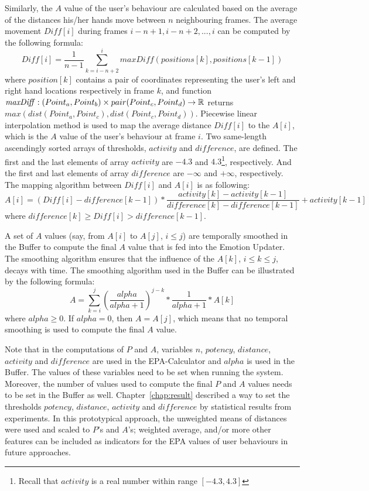 Similarly, the $A$ value of the user's behaviour are calculated based on the average of the distances his/her hands move between $n$ neighbouring frames. The average movement $\mathit{Diff}[i]$ during frames $i-n+1, i-n+2, ... , i$ can be computed by the following formula:
\begin{equation}
\mathit{Diff}[i]=\dfrac{1}{n-1}\sum_{k=i-n+2}^{i}\mathit{maxDiff}(positions[k],positions[k-1])
\end{equation}
where $position[k]$ contains a pair of coordinates representing the user's left and right hand locations respectively in frame $k$, and function $\mathit{maxDiff}: (Point_a, Point_b) \times pair(Point_c,\\ Point_d) \to \mathbb{R}$ returns $max(dist(Point_a, Point_c), dist(Point_c, Point_d))$. Piecewise linear interpolation method is used to map the average distance $\mathit{Diff}[i]$ to the $A[i]$, which is the $A$ value of the user's behaviour at frame $i$. Two same-length ascendingly sorted arrays of thresholds, $activity$ and $\mathit{difference}$, are defined. The first and the last elements of array $activity$ are $-4.3$ and $4.3$\footnote{Recall that $activity$ is a real number within range $[-4.3, 4.3]$}, respectively. And the first and last elements of array $\mathit{difference}$ are $-\infty$ and $+\infty$, respectively. The mapping algorithm between $\mathit{Diff}[i]$ and $A[i]$ is as following:
\begin{equation}
A[i]=(\mathit{Diff}[i]-\mathit{difference}[k-1])*\dfrac{activity[k] - activity[k-1]}{\mathit{difference}[k] - \mathit{difference}[k-1]}+activity[k-1]
\end{equation}
where $\mathit{difference}[k] \geq \mathit{Diff}[i] > \mathit{difference}[k-1]$.

A set of $A$ values (say, from $A[i]$ to $A[j]$, $i \leq j$) are temporally smoothed in the Buffer to compute the final $A$ value that is fed into the Emotion Updater. The smoothing algorithm ensures that the influence of the $A[k]$, $i \leq k \leq j$, decays with time. The smoothing algorithm used in the Buffer can be illustrated by the following formula:
\begin{equation}
A=\sum_{k=i}^{j}(\dfrac{alpha}{alpha+1})^{j-k}*\dfrac{1}{alpha+1}*A[k]
\end{equation}
where $alpha \geq 0$.
If $alpha=0$, then $A=A[j]$, which means that no temporal smoothing is used to compute the final $A$ value.

Note that in the computations of $P$ and $A$, variables $n$, $potency$, $distance$, $activity$ and $\mathit{difference}$ are used in the EPA-Calculator and $alpha$ is used in the Buffer. The values of these variables need to be set when running the system. Moreover, the number of values used to compute the final $P$ and $A$ values needs to be set in the Buffer as well. Chapter~\ref{chap:result} described a way to set the thresholds $potency$, $distance$, $activity$ and $\mathit{difference}$ by statistical results from experiments. In this prototypical approach, the unweighted means of distances were used and scaled to $P$'s and $A$'s; weighted average, and/or more other features can be included as indicators for the EPA values of user behaviours in future approaches.

